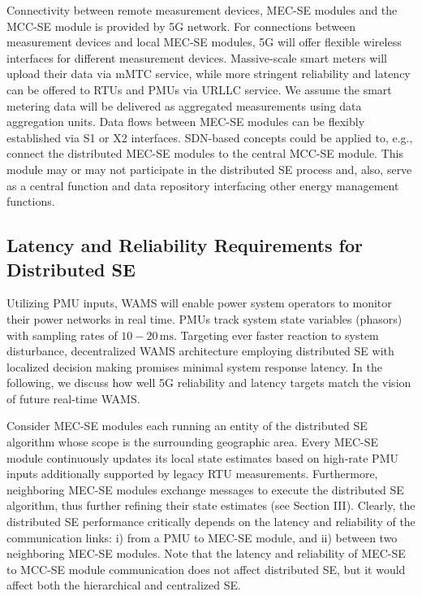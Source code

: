 \documentclass[journal]{IEEEtran}
\begin{document}
Connectivity between remote measurement devices, MEC-SE modules and the MCC-SE module is provided by 5G network.  
For connections between measurement devices and local MEC-SE modules, 5G will offer flexible wireless interfaces for different measurement devices. Massive-scale smart meters will upload their data via mMTC service, while more stringent reliability and latency can be offered to RTUs and PMUs via URLLC service. We assume the smart metering data will be delivered as aggregated measurements using data aggregation units. Data flows between MEC-SE modules can be flexibly established via S1 or X2 interfaces. SDN-based concepts could be applied to, e.g., connect the distributed MEC-SE modules to the central MCC-SE module. This module may or may not participate in the distributed SE process and, also, serve as a central function and data repository interfacing other energy management functions.

\subsection{Latency and Reliability Requirements for Distributed SE}  

Utilizing PMU inputs, WAMS will enable power system operators to monitor their power networks in real time. PMUs track system state variables (phasors) with sampling rates of $10-20\,\mathrm{ms}$. Targeting ever faster reaction to system disturbance, decentralized WAMS architecture employing distributed SE with localized decision making promises minimal system response latency. In the following, we discuss how well 5G reliability and latency targets match the vision of future real-time WAMS.

Consider MEC-SE modules each running an entity of the  distributed SE algorithm whose scope is the surrounding geographic area. Every MEC-SE module continuously updates its local state estimates based on high-rate PMU inputs additionally supported by legacy RTU measurements. Furthermore, neighboring MEC-SE modules exchange messages to execute the distributed SE algorithm, thus further refining their state estimates (see Section III). Clearly, the distributed SE performance critically depends on the latency and reliability of the communication links: i) from a PMU to MEC-SE module, and ii) between two neighboring MEC-SE modules. Note that the latency and reliability of MEC-SE to MCC-SE module communication does not affect distributed SE, but it would affect both the hierarchical and centralized SE.
\end{document}
